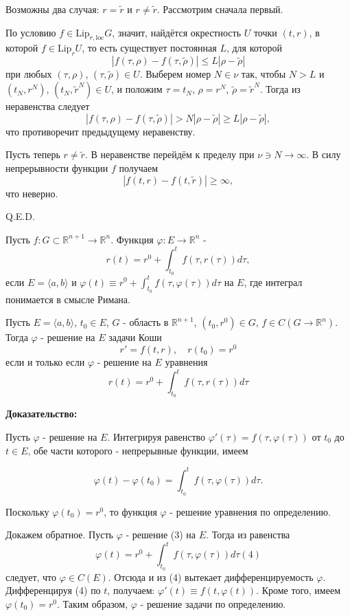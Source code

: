 Возможны два случая: $r = \tilde{r}$ и $r \neq \tilde{r}$. Рассмотрим сначала первый.

По условию $f \in \text{Lip}_{r, \text{loc}} G$, значит, найдётся окрестность $U$ точки $(t, r)$, в которой $f \in \text{Lip}_r U$, то есть существует постоянная $L$, для которой
$$|f(\tau, \rho) - f(\tau, \tilde{\rho})| \leq L |\rho - \tilde{\rho}|$$
при любых $(\tau, \rho)$, $(\tau, \tilde{\rho}) \in U$. Выберем номер $N \in \nu$ так, чтобы $N > L$ и $(t_N, r^N)$, $(t_N, \tilde{r}^N) \in U$, и положим $\tau = t_N$, $\rho = r^N$, $\tilde{\rho} = \tilde{r}^N$. Тогда из неравенства следует
$$|f(\tau, \rho) - f(\tau, \tilde{\rho})| > N |\rho - \tilde{\rho}| \geq L |\rho - \tilde{\rho}|,$$
что противоречит предыдущему неравенству.

Пусть теперь $r \neq \tilde{r}$. В неравенстве перейдём к пределу при $\nu \ni N \rightarrow \infty$. В силу непрерывности функции $f$ получаем
$$
|f(t, r) - f(t, \tilde{r})| \geq \infty,
$$
что неверно.

\hfill Q.E.D.


 Пусть $f: G \subset \mathbb{R}^{n+1} \rightarrow \mathbb{R}^n$. Функция $\varphi: E \rightarrow \mathbb{R}^n$ - 
$$r(t) = r^0 + \int_{t_0}^t f(\tau, r(\tau)) d\tau,$$
если $E = \langle a, b\rangle$ и $\varphi(t) \equiv r^0 + \int_{t_0}^t f(\tau, \varphi(\tau)) d\tau$ на $E$, где интеграл понимается в смысле Римана.


Пусть $E = \langle a, b\rangle$, $t_0 \in E$, $G$ - область в $\mathbb{R}^{n+1}$, $(t_0, r^0) \in G$, $f \in C(G \rightarrow \mathbb{R}^n)$. Тогда $\varphi$ - решение на $E$ задачи Коши
$$r' = f(t, r), \quad r(t_0) = r^0$$
если и только если $\varphi$ - решение на $E$ уравнения
$$r(t) = r^0 + \int_{t_0}^t f(\tau, r(\tau)) d\tau$$ 

\textbf{Доказательство:} 

Пусть $\varphi$ - решение на $E$. Интегрируя равенство $\varphi'(\tau) = f(\tau, \varphi(\tau))$ от $t_0$ до $t \in E$, обе части которого - непрерывные функции, имеем

$$\varphi(t) - \varphi(t_0) = \int_{t_0}^t f(\tau, \varphi(\tau)) d\tau.$$

Поскольку $\varphi(t_0) = r^0$, то функция $\varphi$ - решение уравнения по определению.

Докажем обратное. Пусть $\varphi$ - решение (3) на $E$. Тогда из равенства
$$\varphi(t) = r^0 + \int_{t_0}^t f(\tau, \varphi(\tau)) d\tau (4)$$
следует, что $\varphi \in C(E)$. Отсюда и из (4) вытекает дифференцируемость $\varphi$. Дифференцируя (4) по $t$, получаем: $\varphi'(t) \equiv f(t, \varphi(t))$. Кроме того, имеем $\varphi(t_0) = r^0$. Таким образом, $\varphi$ - решение задачи по определению. 

